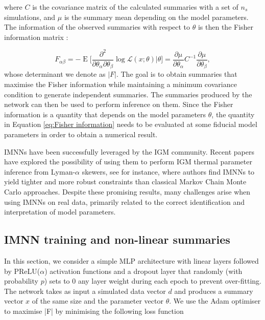 where $C$ is the covariance matrix of the calculated summaries with a set of $n_s$ simulations, and $\mu$ is the summary mean depending on the model parameters. The information of the observed summaries with respect to $\theta$ is then the Fisher information matrix \cite{ly2017tutorialfisherinformation}:

\begin{equation}\label{eq:Fisher information}
    F_{\alpha \beta} =-\operatorname{E}\bigg[\frac{\partial^2}{\partial\theta_\alpha\partial\theta_\beta}\log \mathcal{L}(x;\theta)\bigg|\theta\bigg]= \frac{\partial \mu}{\partial \theta_\alpha}C^{-1} \frac{\partial \mu}{\partial \theta_\beta},
\end{equation}
whose determinant we denote as $|F|$. 
The goal is to obtain summaries that maximise the Fisher information while maintaining a minimum covariance condition to generate independent summaries. The summaries produced by the network can then be used to perform inference on them. Since the Fisher information is a quantity that depends on the model parameters $\theta$, the quantity in Equation \ref{eq:Fisher information} needs to be evaluated at some fiducial model parameters in order to obtain a numerical result.

IMNNs have been successfully leveraged by the IGM community. Recent papers have explored the possibility of using them to perform IGM thermal parameter inference from Lyman-$\alpha$ skewers, see \cite{maitra2024parameterestimationlyalphaforest} for instance, where authors find IMNNs to yield tighter and more robust constraints than classical Markov Chain Monte Carlo approaches. Despite these promising results, many challenges arise when using IMNNs on real data, primarily related to the correct identification and interpretation of model parameters.

\subsection{IMNN training and non-linear summaries}
In this section, we consider a simple MLP architecture with linear layers followed by PReLU($\alpha$) activation functions and a dropout layer that randomly (with probability $p$) sets to 0 any layer weight during each epoch to prevent over-fitting. The network takes as input a simulated data vector $d$ and produces a summary vector $x$ of the same size and the parameter vector $\theta$. We use the Adam optimiser to maximise |F| by minimising the following loss function

